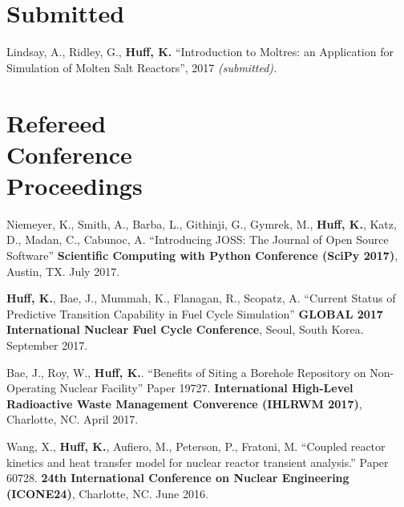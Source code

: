 \documentclass[margin,line]{resume}
\newcommand{\Cyclus}{\textsc{Cyclus}\xspace}%
\begin{document}
\begin{resume}
    \section{\mysidestyle Submitted}
      \begin{bibenum}
       \item Lindsay, A., Ridley, G., \textbf{Huff, K.} ``Introduction to 
               Moltres: an Application for Simulation of Molten Salt 
               Reactors'',  2017 \textsl{(submitted).} 
      \end{bibenum}
    \section{\mysidestyle Refereed\\Conference\\Proceedings}
    \begin{bibenum}
    \item Niemeyer, K., Smith, A., Barba, L., Githinji, G., Gymrek, M., 
            \textbf{Huff, K.}, Katz, D., Madan, C., Cabunoc, A. ``Introducing 
            JOSS: The Journal of Open Source Software'' \textbf{Scientific 
            Computing with Python Conference (SciPy 2017)}, Austin, TX. July 
            2017.
    \item \textbf{Huff, K.}, Bae, J., Mummah, K., Flanagan, R., Scopatz, A.
            ``Current Status of Predictive Transition Capability in Fuel Cycle 
            Simulation'' \textbf{GLOBAL 2017 International Nuclear Fuel Cycle 
            Conference}, Seoul, South Korea. September 2017.
      \item Bae, J., Roy, W., \textbf{Huff, K.}.
            ``Benefits of Siting a Borehole Repository on Non-Operating Nuclear 
            Facility'' Paper 19727.  \textbf{International High-Level Radioactive 
            Waste Management Converence (IHLRWM 2017)},
            Charlotte, NC. April 2017. 
      \item Wang, X., \textbf{Huff, K.}, Aufiero, M., Peterson, P., Fratoni, M.
            ``Coupled reactor kinetics and heat transfer model for nuclear 
            reactor transient analysis.'' Paper 60728.  \textbf{24th 
            International Conference on Nuclear Engineering (ICONE24)}, 
            Charlotte, NC.  June 2016. 

\end{bibenum}
\end{resume}
\end{document}
